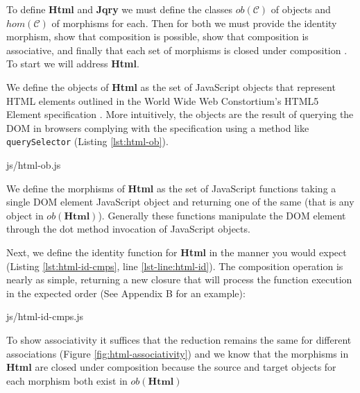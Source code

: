 \documentclass[preprint]{sigplanconf}
\begin{document}
To define \textbf{Html} and \textbf{Jqry} we must define the classes \begin{math}ob(\mathcal{C})\end{math} of objects and \begin{math}hom(\mathcal{C})\end{math} of morphisms for each. Then for both we must provide the identity morphism, show that composition is possible, show that composition is associative, and finally that each set of morphisms is closed under composition \cite[p. ~1]{bib:category-definition}. To start we will address \textbf{Html}.

We define the objects of \textbf{Html} as the set of JavaScript objects that represent HTML elements outlined in the World Wide Web Constortium's HTML5 Element specification \cite{bib:dom}. More intuitively, the objects are the result of querying the DOM in browsers complying with the specification using a method like \verb|querySelector| (Listing \ref{lst:html-ob}).

\begin{lstinputlisting}[
    language=JavaScript,
    caption={Sources of Html objects},
    label={lst:html-ob}
]{js/html-ob.js}
\end{lstinputlisting}

We define the morphisms of \textbf{Html} as the set of JavaScript functions taking a single DOM element JavaScript object and returning one of the same (that is any object in \begin{math}ob(\mathbf{Html})\end{math}). Generally these functions manipulate the DOM element through the dot method invocation of JavaScript objects.

Next, we define the identity function for \textbf{Html} in the manner you would expect (Listing \ref{lst:html-id-cmps}, line \ref{lst-line:html-id}). The composition operation is nearly as simple, returning a new closure that will process the function execution in the expected order (See Appendix B for an example):

\begin{lstinputlisting}[
    language=JavaScript,
    caption={Identity and Composition in Html},
    label={lst:html-id-cmps},
    escapeinside={@}{@}
]{js/html-id-cmps.js}
\end{lstinputlisting}

To show associativity it suffices that the reduction remains the same for different associations (Figure \ref{fig:html-associativity}) and we know that the morphisms in \textbf{Html} are closed under composition because the source and target objects for each morphism both exist in \begin{math}ob(\mathbf{Html})\end{math}
\end{document}

